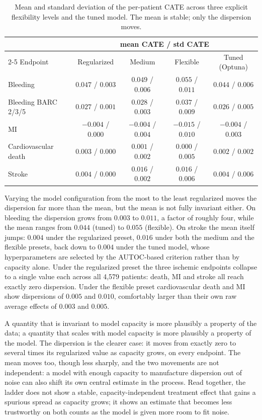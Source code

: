 \begin{table}[H]
\centering
\caption{Mean and standard deviation of the per-patient CATE across three
explicit flexibility levels and the tuned model. The mean is stable; only the
dispersion moves.}
\label{tab:flex-ladder}
\small
\begin{tabular}{lcccc}
\toprule
& \multicolumn{4}{c}{mean CATE / std CATE} \\
\cmidrule(lr){2-5}
Endpoint & Regularized & Medium & Flexible & Tuned (Optuna) \\
\midrule
Bleeding             & $0.047$ / $0.003$ & $0.049$ / $0.006$ & $0.055$ / $0.011$ & $0.044$ / $0.006$ \\
Bleeding BARC 2/3/5  & $0.027$ / $0.001$ & $0.028$ / $0.003$ & $0.037$ / $0.009$ & $0.026$ / $0.005$ \\
MI                   & $-0.004$ / $0.000$ & $-0.004$ / $0.004$ & $-0.015$ / $0.010$ & $-0.004$ / $0.003$ \\
Cardiovascular death & $0.003$ / $0.000$ & $0.001$ / $0.002$ & $0.000$ / $0.005$ & $0.002$ / $0.002$ \\
Stroke               & $0.004$ / $0.000$ & $0.016$ / $0.002$ & $0.016$ / $0.006$ & $0.004$ / $0.006$ \\
\bottomrule
\end{tabular}
\end{table}

Varying the model configuration from the most to the least regularized moves
the dispersion far more than the mean, but the mean is not fully invariant
either. On bleeding the dispersion grows from $0.003$ to $0.011$, a factor of
roughly four, while the mean ranges from $0.044$ (tuned) to $0.055$ (flexible).
On stroke the mean itself jumps: $0.004$ under the regularized preset, $0.016$
under both the medium and the flexible presets, back down to $0.004$ under the
tuned model, whose hyperparameters are selected by the AUTOC-based criterion
rather than by capacity alone. Under the regularized preset the three ischemic
endpoints collapse to a single value each across all 4,579 patients: death, MI
and stroke all reach exactly zero dispersion. Under the flexible preset
cardiovascular death and MI show dispersions of $0.005$ and $0.010$,
comfortably larger than their own raw average effects of $0.003$ and $0.005$.

A quantity that is invariant to model capacity is more plausibly a property of
the data; a quantity that scales with model capacity is more plausibly a
property of the model. The dispersion is the clearer case: it moves from
exactly zero to several times its regularized value as capacity grows, on
every endpoint. The mean moves too, though less sharply, and the two
movements are not independent: a model with enough capacity to manufacture
dispersion out of noise can also shift its own central estimate in the
process. Read together, the ladder does not show a stable, capacity-independent
treatment effect that gains a spurious spread as capacity grows; it shows an
estimate that becomes less trustworthy on both counts as the model is given
more room to fit noise.

